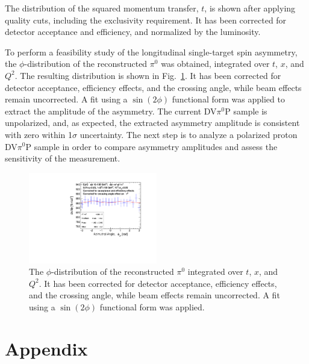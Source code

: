 \documentclass[letterpaper,12pt]{article}
\begin{document}
The distribution of the squared momentum transfer, $t$, is shown after applying quality cuts, including the exclusivity requirement. It has been corrected for detector acceptance and efficiency, and normalized by the luminosity.

To perform a feasibility study of the longitudinal single-target spin asymmetry, the $\phi$-distribution of the reconstructed $\pi^{0}$ was obtained, integrated over $t$, $x$, and $Q^{2}$. The resulting distribution is shown in Fig.~\ref{fig:phidist}. It has been corrected for detector acceptance, efficiency effects, and the crossing angle, while beam effects remain uncorrected. A fit using a $\sin(2\phi)$ functional form was applied to extract the amplitude of the asymmetry. The current DV$\pi^{0}$P sample is unpolarized, and, as expected, the extracted asymmetry amplitude is consistent with zero within 1$\sigma$ uncertainty. The next step is to analyze a polarized proton DV$\pi^{0}$P sample in order to compare asymmetry amplitudes and assess the sensitivity of the measurement.

\begin{figure}[ht]
    \centering
    \includegraphics[width=0.5\textwidth]{Figures/phi_distribution_corrected_fit.pdf}
    \caption{The $\phi$-distribution of the reconstructed $\pi^{0}$ integrated over $t$, $x$, and $Q^{2}$. It has been corrected for detector acceptance, efficiency effects, and the crossing angle, while beam effects remain uncorrected. A fit using a $\sin(2\phi)$ functional form was applied.}
\label{fig:phidist}
\end{figure}


\appendix
\section{Appendix}


 

\end{document}

